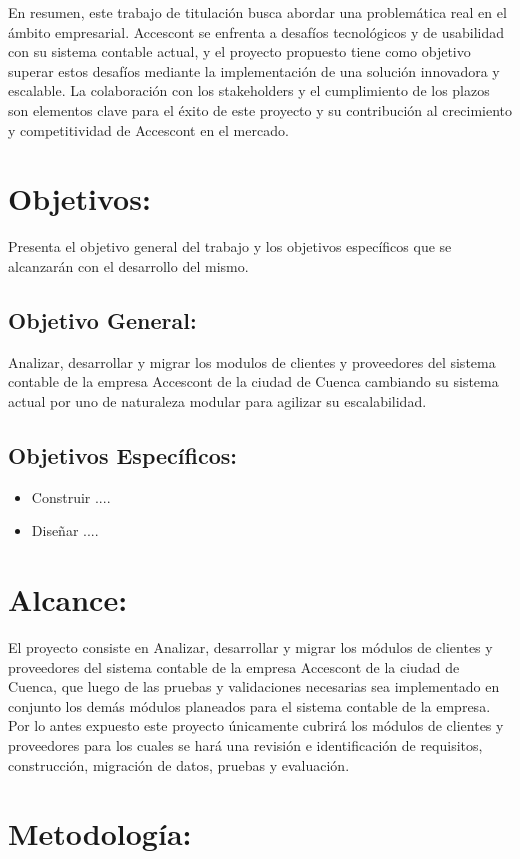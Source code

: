 \documentclass{article}
\begin{document}
 En resumen, este trabajo de titulación busca abordar una problemática real en el ámbito empresarial. Accescont se enfrenta a desafíos tecnológicos y de usabilidad con su sistema contable actual, y el proyecto propuesto tiene como objetivo superar estos desafíos mediante la implementación de una solución innovadora y escalable. La colaboración con los stakeholders y el cumplimiento de los plazos son elementos clave para el éxito de este proyecto y su contribución al crecimiento y competitividad de Accescont en el mercado. 

\section{Objetivos:}
Presenta el objetivo general del trabajo y los objetivos específicos que se alcanzarán con el desarrollo del mismo. 
\subsection*{Objetivo General:}
Analizar, desarrollar y migrar  los modulos de clientes y proveedores del sistema contable de la empresa Accescont de la ciudad de Cuenca cambiando su sistema actual por uno de naturaleza modular para agilizar su escalabilidad.
\subsection*{Objetivos Específicos:}

\begin{itemize}
    \item Construir ....
    \item Diseñar ....
\end{itemize}

\section{Alcance:}
El proyecto consiste en Analizar, desarrollar y migrar los módulos de clientes y proveedores del sistema contable de la empresa Accescont de la ciudad de Cuenca, que luego de las pruebas y validaciones necesarias sea implementado en conjunto los demás módulos planeados para el sistema contable de la empresa. Por lo antes expuesto este proyecto únicamente cubrirá los módulos de clientes y proveedores para los cuales se hará una revisión e identificación de requisitos, construcción, migración de datos, pruebas y evaluación.
\section{Metodología:}
\end{document}
